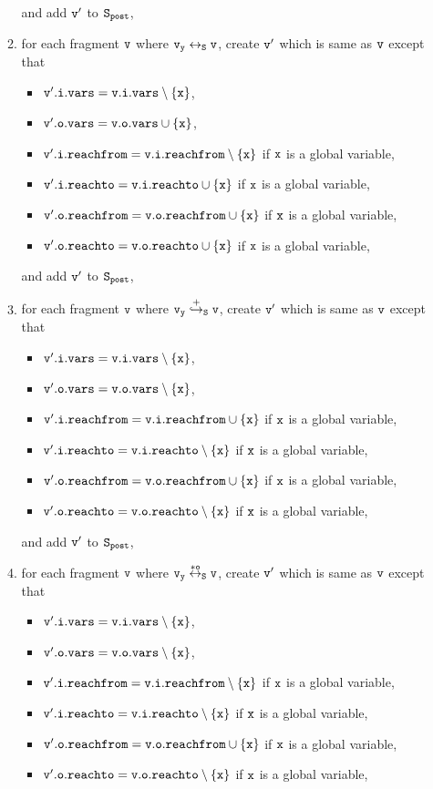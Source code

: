 \begin{itemize}
\begin{enumerate}
\begin{itemize}
\end{itemize}
and add $\tt v'$ to $\tt S_{post}$,
\item for each fragment $\tt v$ where $\tt v_y \leftrightarrow_S v$, create $\tt v'$ which is same as $\tt v$ except that
\begin{itemize} 
\item $\tt v'.i.vars = v.i.vars \setminus \{x\}$,
\item $\tt v'.o.vars = v.o.vars \cup \{x\}$,
\item $\tt v'.i.reachfrom = v.i.reachfrom \setminus \{x\}$ if $\tt x$ is a global variable,
\item $\tt v'.i.reachto = v.i.reachto \cup \{x\}$ if $\tt x$ is a global variable,
 \item $\tt v'.o.reachfrom = v.o.reachfrom \cup \{x\}$ if $\tt x$ is a global variable,
 \item $\tt v'.o.reachto = v.o.reachto \cup \{x\}$ if $\tt x$ is a global variable,
\end{itemize}
and add $\tt v'$ to $\tt S_{post}$,

\item for each fragment $\tt v$ where $\tt v_y \overset{+}\hookrightarrow_S v$, create $\tt v'$ which is same as $\tt v$ except that
\begin{itemize}
\item $\tt v'.i.vars = v.i.vars \setminus \{x\}$,
\item $\tt v'.o.vars = v.o.vars \setminus \{x\}$,
\item $\tt v'.i.reachfrom = v.i.reachfrom \cup \{x\}$ if $\tt x$ is a global variable,
\item $\tt v'.i.reachto = v.i.reachto \setminus \{x\}$ if $\tt x$ is a global variable,
 \item $\tt v'.o.reachfrom = v.o.reachfrom \cup \{x\}$ if $\tt x$ is a global variable,
 \item $\tt v'.o.reachto = v.o.reachto \setminus \{x\}$ if $\tt x$ is a global variable,

\end{itemize}
and add $\tt v'$ to $\tt S_{post}$,
\item for each fragment $\tt v$ where $\tt v_y \overset{*o}\leftrightarrow_S v$, create $\tt v'$ which is same as $\tt v$ except that
\begin{itemize}
\item $\tt v'.i.vars = v.i.vars \setminus \{x\}$,
\item $\tt v'.o.vars = v.o.vars \setminus \{x\}$,
\item $\tt v'.i.reachfrom = v.i.reachfrom \setminus \{x\}$ if $\tt x$ is a global variable,
\item $\tt v'.i.reachto = v.i.reachto \setminus \{x\}$ if $\tt x$ is a global variable,
\item $\tt v'.o.reachfrom = v.o.reachfrom \cup \{x\}$ if $\tt x$ is a global variable,
\item $\tt v'.o.reachto = v.o.reachto \setminus \{x\}$ if $\tt x$ is a global variable,


\end{itemize}
\end{enumerate}
\end{itemize}

